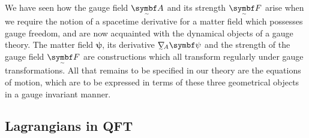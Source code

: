 
We have seen how the gauge field $\tsbm A$ and its strength $\tsbm F$ arise when we require the notion of a spacetime derivative for a matter field which possesses gauge freedom, and are now acquainted with the dynamical objects of a gauge theory.
The matter field $\bm\psi$, its derivative $\ts\nabla_{\!A}\bm\psi$ and the strength of the gauge field $\tsbm F$ are constructions which all transform regularly under gauge transformations.
All that remains to be specified in our theory are the equations of motion, which are to be expressed in terms of these three geometrical objects in a gauge invariant manner.









\subsection{Lagrangians in QFT}
\label{sec:Lagrangians}


